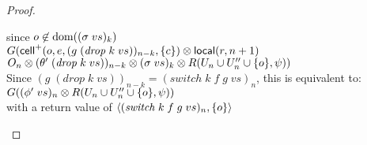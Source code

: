 \begin{proof}
\begin{enumerate}
\begin{tabbedproof}
  \ooooo since $o \not\in \mbox{dom}({(\sigma\;vs)_k})$ \\
  \ooooo $G(\mathsf{cell}^{+}({o}, {e}, {(g\;(\mathit{drop}\;k\;vs))_{n-k}}, {\{{c}\}}) \otimes \mathsf{local}({r}, {n+1})$ \\
  \oooooo $O_n \otimes (\theta'\;(\mathit{drop}\;k\;vs))_{n-k} \otimes (\sigma\;vs)_k \otimes R(U_n \cup U''_n \cup \{{o}\}, \psi))$ \\ 
  \oooo Since $(g\;(\mathit{drop}\;k\;vs))_{n-k} = (\mathit{switch}\;k\;f\;g\;vs)_n$, this is equivalent to:\\
  \ooooo $G((\phi'\;vs)_n \otimes R(U_n \cup U''_n \cup \{{o}\}, \psi))$ \\
  \oooo with a return value of $\left<{(\mathit{switch}\;k\;f\;g\;vs)_n},{\{{o}\}}\right>$ \\ 
  \end{tabbedproof}
\end{enumerate}
\end{proof}


